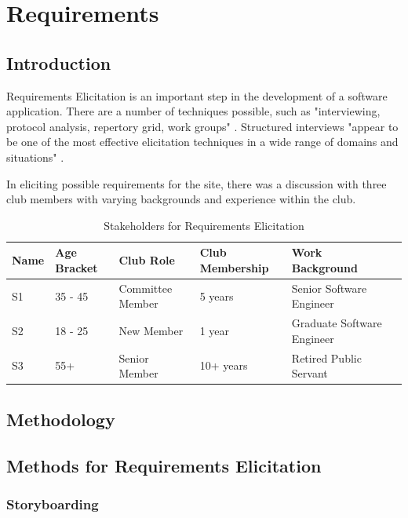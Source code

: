 \chapter{Requirements}
\label{requirements}

\section{Introduction}

Requirements Elicitation is an important step in the development of a software application. There are a number of techniques possible, such as "interviewing, protocol analysis, repertory grid, work groups" \parencite{davis2006effectiveness}. Structured interviews "appear to be one of the most effective elicitation techniques in a wide range of domains and situations" \parencite{davis2006effectiveness}. 

In eliciting possible requirements for the site, there was a discussion with three club members with varying backgrounds and experience within the club.

\begin{table}[H]
\caption{Stakeholders for Requirements Elicitation}
\begin{center}
    \begin{tabular}{ | l | l | l | l | l| p{5cm} |}
    \hline
    Name & Age Bracket & Club Role & Club Membership & Work Background \\ \hline
	S1 & 35 - 45& Committee Member & 5 years & Senior Software Engineer \\ \hline
	S2 & 18 - 25 & New Member & 1 year & Graduate Software Engineer \\ \hline
	S3 & 55+ & Senior Member & 10+ years & Retired Public Servant \\ \hline
    \end{tabular}
\end{center}
\label{fig:userelicit}
\end{table}

\section{Methodology}



\section{Methods for Requirements Elicitation}

\subsection{Storyboarding}

